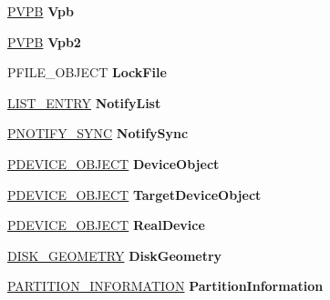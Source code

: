 \begin{DoxyCompactItemize}
\hyperlink{struct___v_p_b}{P\+V\+PB} {\bfseries Vpb}
\item 
\mbox{\label{struct___e_x_t2___v_c_b_ac5d08b8f33609ea49832ced9baedd1dd}} 
\hyperlink{struct___v_p_b}{P\+V\+PB} {\bfseries Vpb2}
\item 
\mbox{\label{struct___e_x_t2___v_c_b_a7e3090c896f52e9fac79c950bca85841}} 
P\+F\+I\+L\+E\+\_\+\+O\+B\+J\+E\+CT {\bfseries Lock\+File}
\item 
\mbox{\label{struct___e_x_t2___v_c_b_a447cefa6a6a7a682c6bbf6539429e218}} 
\hyperlink{struct___l_i_s_t___e_n_t_r_y}{L\+I\+S\+T\+\_\+\+E\+N\+T\+RY} {\bfseries Notify\+List}
\item 
\mbox{\label{struct___e_x_t2___v_c_b_a1d9364906798076c1f52bd3ba9773a83}} 
\hyperlink{interfacevoid}{P\+N\+O\+T\+I\+F\+Y\+\_\+\+S\+Y\+NC} {\bfseries Notify\+Sync}
\item 
\mbox{\label{struct___e_x_t2___v_c_b_a4390a89b5ed31b402d7bd7f6b9f93d2b}} 
\hyperlink{struct___d_e_v_i_c_e___o_b_j_e_c_t}{P\+D\+E\+V\+I\+C\+E\+\_\+\+O\+B\+J\+E\+CT} {\bfseries Device\+Object}
\item 
\mbox{\label{struct___e_x_t2___v_c_b_ab5a2fa60d88dd245c43f3637eed81fea}} 
\hyperlink{struct___d_e_v_i_c_e___o_b_j_e_c_t}{P\+D\+E\+V\+I\+C\+E\+\_\+\+O\+B\+J\+E\+CT} {\bfseries Target\+Device\+Object}
\item 
\mbox{\label{struct___e_x_t2___v_c_b_a0a7c44b0a0bf2e4553593e0bcb91844d}} 
\hyperlink{struct___d_e_v_i_c_e___o_b_j_e_c_t}{P\+D\+E\+V\+I\+C\+E\+\_\+\+O\+B\+J\+E\+CT} {\bfseries Real\+Device}
\item 
\mbox{\label{struct___e_x_t2___v_c_b_ac95de93872523a2463a1e4f733c054aa}} 
\hyperlink{struct___d_i_s_k___g_e_o_m_e_t_r_y}{D\+I\+S\+K\+\_\+\+G\+E\+O\+M\+E\+T\+RY} {\bfseries Disk\+Geometry}
\item 
\mbox{\label{struct___e_x_t2___v_c_b_a2d909e1ab1f70426a0f3d95e3748d874}} 
\hyperlink{struct___p_a_r_t_i_t_i_o_n___i_n_f_o_r_m_a_t_i_o_n}{P\+A\+R\+T\+I\+T\+I\+O\+N\+\_\+\+I\+N\+F\+O\+R\+M\+A\+T\+I\+ON} {\bfseries Partition\+Information}

\end{DoxyCompactItemize}
